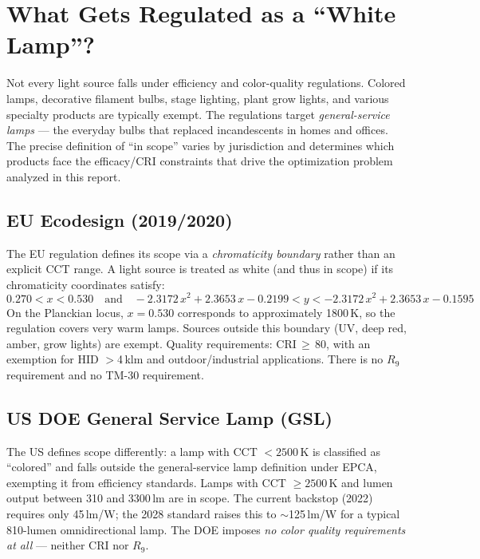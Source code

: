 \documentclass[11pt]{article}
\begin{document}
\section{What Gets Regulated as a ``White Lamp''?}
\label{sec:scope}

Not every light source falls under efficiency and color-quality
regulations.  Colored lamps, decorative filament bulbs, stage lighting,
plant grow lights, and various specialty products are typically exempt.
The regulations target \emph{general-service lamps} --- the everyday
bulbs that replaced incandescents in homes and offices.  The precise
definition of ``in scope'' varies by jurisdiction and determines which
products face the efficacy/CRI constraints that drive the optimization
problem analyzed in this report.

\subsection{EU Ecodesign (2019/2020)}

The EU regulation defines its scope via a \emph{chromaticity boundary}
rather than an explicit CCT range.  A light source is treated as white
(and thus in scope) if its chromaticity coordinates satisfy:
\[
0.270 < x < 0.530 \quad\text{and}\quad
-2.3172\,x^2 + 2.3653\,x - 0.2199 < y < -2.3172\,x^2 + 2.3653\,x - 0.1595
\]
On the Planckian locus, $x = 0.530$ corresponds to approximately
1800\,K, so the regulation covers very warm lamps.  Sources outside
this boundary (UV, deep red, amber, grow lights) are exempt.
Quality requirements: CRI\,$\geq$\,80, with an exemption for
HID $>$4\,klm and outdoor/industrial applications.  There is no
$R_9$ requirement and no TM-30 requirement.

\subsection{US DOE General Service Lamp (GSL)}

The US defines scope differently: a lamp with CCT $< 2500$\,K is
classified as ``colored'' and falls outside the general-service lamp
definition under EPCA, exempting it from efficiency standards.
Lamps with CCT $\geq 2500$\,K and lumen output between 310 and
3300\,lm are in scope.  The current backstop (2022) requires only
45\,lm/W; the 2028 standard raises this to $\sim$125\,lm/W for a
typical 810-lumen omnidirectional lamp.  The DOE imposes
\emph{no color quality requirements at all} --- neither CRI nor $R_9$.
\end{document}
